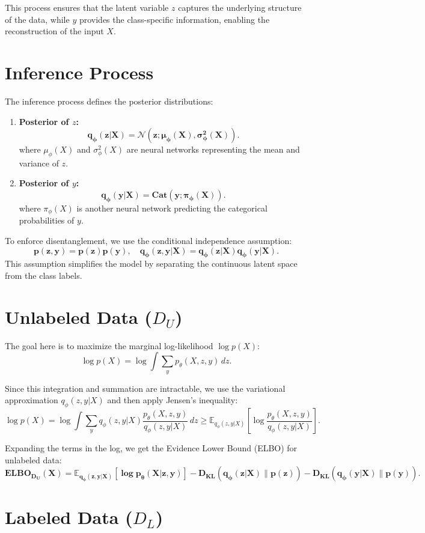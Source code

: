 \documentclass{article}
\begin{document}
This process ensures that the latent variable $z$ captures the underlying structure of the data, while $y$ provides the class-specific information, enabling the reconstruction of the input $X$.

\section*{Inference Process}

The inference process defines the posterior distributions:
\begin{enumerate}
    \item \textbf{Posterior of $z$:}
    \[
    \bm{q_\phi(z|X) = \mathcal{N}(z; \mu_\phi(X), \sigma_\phi^2(X)).} \tag{2}
    \]
    where $\mu_\phi(X)$ and $\sigma_\phi^2(X)$ are neural networks representing the mean and variance of $z$.
    \item \textbf{Posterior of $y$:}
    \[
    \bm{q_\phi(y|X) = \text{Cat}(y; \pi_\phi(X)).} \tag{3}
    \]
    where $\pi_\phi(X)$ is another neural network predicting the categorical probabilities of $y$.
\end{enumerate}

To enforce disentanglement, we use the conditional independence assumption:
\[
\bm{p(z, y) = p(z)p(y), \quad q_\phi(z, y|X) = q_\phi(z|X)q_\phi(y|X).} \tag{4}
\]
This assumption simplifies the model by separating the continuous latent space from the class labels.

\section*{Unlabeled Data ($D_U$)}

The goal here is to maximize the marginal log-likelihood $\log p(X)$:
\[
\log p(X) = \log \int \sum_y p_\theta(X, z, y) \, dz.
\]

Since this integration and summation are intractable, we use the variational approximation $q_\phi(z, y|X)$ and then apply Jensen's inequality:
\[
\log p(X) = \log \int \sum_y q_\phi(z, y|X) \frac{p_\theta(X, z, y)}{q_\phi(z, y|X)} \, dz \geq \mathbb{E}_{q_\phi(z, y|X)} \left[ \log \frac{p_\theta(X, z, y)}{q_\phi(z, y|X)} \right].
\]

Expanding the terms in the log, we get the Evidence Lower Bound (ELBO) for unlabeled data:
\[
\bm{\text{ELBO}_{D_U}(X) = \mathbb{E}_{q_\phi(z, y|X)}[\log p_\theta(X|z, y)] 
- D_{\text{KL}}(q_\phi(z|X) \| p(z)) 
- D_{\text{KL}}(q_\phi(y|X) \| p(y)).} \tag{5}
\]

\section*{Labeled Data ($D_L$)}
\end{document}
